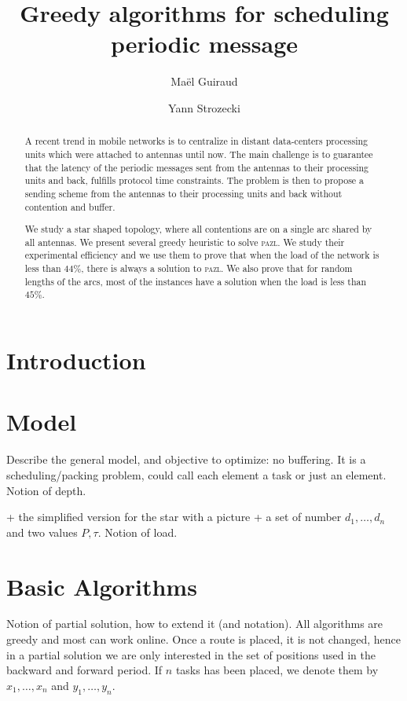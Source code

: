 \documentclass[10pt, conference, letterpaper]{IEEEtran}
\title{Greedy algorithms for scheduling periodic message }
\author[1,2]{Ma\"el Guiraud}
\author[1]{Yann Strozecki}
\affil[1]{David Laboratory, UVSQ}
\affil[2]{Nokia Bell Labs France}
\newcommand\pazl{\textsc{pazl}\xspace}
\begin{document}
\maketitle

\begin{abstract}

A recent trend in mobile networks is to centralize in distant data-centers  processing units which were attached to antennas until now. The main challenge is to guarantee that the latency of the periodic messages sent from the antennas to their processing units and back, fulfills protocol time constraints. The problem is then to propose a sending scheme from the antennas to their processing units and back without contention and buffer.

We study a star shaped topology, where all contentions are on a single arc shared by all antennas. We present several greedy heuristic to solve \pazl. We study their experimental efficiency and we use them to prove that when the load of the network is less than $44\%$, there is always a solution to \pazl. We also prove that for random lengths of the arcs, most of the instances have a solution when the load is less than $45\%$.  
\end{abstract}


\section{Introduction}


\section{Model}
Describe the general model, and objective to optimize: no buffering.
It is a scheduling/packing problem, could call each element a task or just an element. 
Notion of depth.

 + the simplified version for the star with a picture + a set of number $d_1,\dots,d_n$ and two values $P, \tau$. Notion of load.
\cite{Guir1806:Deterministic}

\section{Basic Algorithms}

Notion of partial solution, how to extend it (and notation). All
algorithms are greedy and most can work online. Once a route is placed,
it is not changed, hence in a partial solution we are only interested in the 
set of positions used in the backward and forward period. If $n$ tasks has been
placed, we denote them by $x_1, \dots, x_n$ and $y_1,\dots,y_n$.
\end{document}
